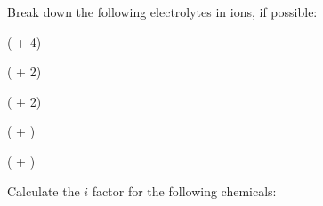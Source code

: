 \documentclass[main.tex]{subfiles}
\begin{document}
\begin{multicols*}{2}
\begin{question}[ID=\the\value{numA}]
Break down the following electrolytes in ions, if possible:
\begin{inparaenum}[(a)]
\item   {}  %
\item   {}  %
\item   {}  %
\item   {}  %
\item   {}  %
\end{inparaenum}
\end{question}
\begin{solution}
\begin{inparaenum}[(a)]
\item   {}    ( + 4)
\item   {}    (  + 2)
\item   {}    (  + 2)
\item   {}    (  + )
\item   {}    (  + )
 \end{inparaenum}\hspace{0.1cm}\end{solution}%



\begin{question}[ID=\the\value{numA}]
Calculate the $i$ factor for the following chemicals:
\begin{inparaenum}[(a)]
\item   {}  %
\item   {}  %
\item   {}  %
\item   {}  %
\end{inparaenum}
\end{question}
\begin{solution}
\begin{inparaenum}[(a)]
\item   {}  %
\item   {}  %
\item   {}  %
\item   {}  %
 \end{inparaenum}\hspace{0.1cm}\end{solution}%





\end{multicols*}
\end{document}
